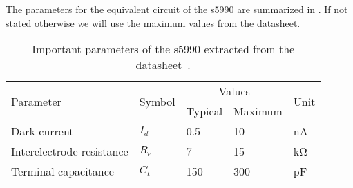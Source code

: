 The parameters for the equivalent circuit of the \gls{s5990} are summarized in .
If not stated otherwise we will use the maximum values from the datasheet.
\begin{table}[H]
	\centering
	\begin{tabular}{lllll}
		\toprule
			\multirow{2}[3]{*}{Parameter} &
			\multirow{2}[3]{*}{Symbol} &
			\multicolumn{2}{c}{Values} &
			\multirow{2}[3]{*}{Unit} \\
			\cmidrule(lr){3-4} & & Typical & Maximum & \\
		\midrule
		Dark current & $I_d$ & \num{0.5} & \num{10} & \si{\nano\ampere}\\
		Interelectrode resistance & $R_e$ & \num{7} & \num{15} & \si{\kilo\ohm}\\
		Terminal capacitance & $C_t$ & \num{150} & \num{300} & \si{\pico\farad}\\
		\bottomrule	
	\end{tabular}
	\caption{Important parameters of the \gls{s5990} extracted from the datasheet~\cite{HamamatsuS5990}.}\label{tab:psd_s5990}
\end{table}
